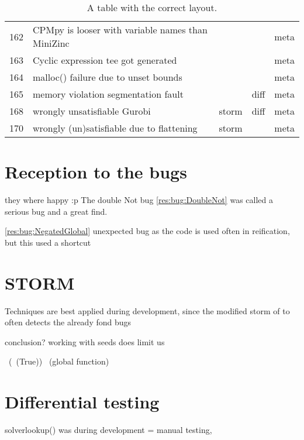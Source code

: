 \begin{table}[]
\begin{tabular}{lllll}
		162   & CPMpy is looser with variable names than MiniZinc         &                &              & meta         \\
		163   & Cyclic expression tee got generated                       &                &              & meta         \\
		164   & malloc() failure due to unset bounds                      &                &              & meta         \\
		165   & memory violation segmentation fault                       &                & diff         & meta         \\
		168   & wrongly unsatisfiable Gurobi                              & storm          & diff         & meta         \\
		170   & wrongly (un)satisfiable due to flattening                 & storm          &              & meta         \\ \bottomrule
	\end{tabular}
	\caption{A table with the correct layout.}
	\label{tab:bug:Technique}
\end{table}


\section{Reception to the bugs}
they where happy :p
The double Not bug \ref{res:bug:DoubleNot} was called a serious bug and a great find. %

\ref{res:bug:NegatedGlobal}
unexpected bug as the code is used often in reification, but this used a shortcut


\section{STORM}
Techniques are best applied during development, since the modified storm of to often detects the already fond bugs

conclusion? 
working with seeds does limit us


~(~(True))
~(global function)
\section{Differential testing}
solverlookup()  was during development = manual testing, 


